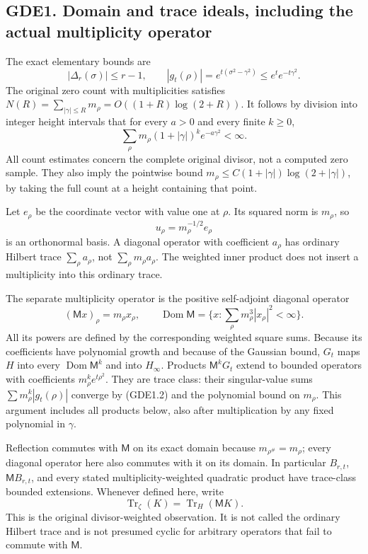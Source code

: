 \subsection{GDE1. Domain and trace ideals, including the actual
multiplicity
operator}\label{gde1.-domain-and-trace-ideals-including-the-actual-multiplicity-operator}

The exact elementary bounds are \[
|\Delta_r(\sigma)|\le r-1,\qquad
|g_t(\rho)|=e^{t(\sigma^2-\gamma^2)}\le e^t e^{-t\gamma^2}.
\tag{GDE1.1}
\] The original zero count with multiplicities satisfies
\(N(R)=\sum_{|\gamma|\le R}m_\rho=O((1+R)\log(2+R))\). It follows by
division into integer height intervals that for every \(a>0\) and every
finite \(k\ge0\), \[
\sum_\rho m_\rho(1+|\gamma|)^k e^{-a\gamma^2}<\infty.
\tag{GDE1.2}
\] All count estimates concern the complete original divisor, not a
computed zero sample. They also imply the pointwise bound
\(m_\rho\le C(1+|\gamma|)\log(2+|\gamma|)\), by taking the full count at
a height containing that point.

Let \(e_\rho\) be the coordinate vector with value one at \(\rho\). Its
squared norm is \(m_\rho\), so \[
u_\rho=m_\rho^{-1/2}e_\rho
\tag{GDE1.3}
\] is an orthonormal basis. A diagonal operator with coefficient
\(a_\rho\) has ordinary Hilbert trace \(\sum_\rho a_\rho\), not
\(\sum_\rho m_\rho a_\rho\). The weighted inner product does not insert
a multiplicity into this ordinary trace.

The separate multiplicity operator is the positive self-adjoint diagonal
operator \[
(\mathsf Mx)_\rho=m_\rho x_\rho,
\qquad \operatorname{Dom}\mathsf M
=\{x:\sum_\rho m_\rho^3|x_\rho|^2<\infty\}.
\tag{GDE1.4}
\] All its powers are defined by the corresponding weighted square sums.
Because its coefficients have polynomial growth and because of the
Gaussian bound, \(G_t\) maps \(H\) into every
\(\operatorname{Dom}\mathsf M^k\) and into \(H_\infty\). Products
\(\mathsf M^kG_t\) extend to bounded operators with coefficients
\(m_\rho^ke^{t\rho^2}\). They are trace class: their singular-value sums
\(\sum m_\rho^k|g_t(\rho)|\) converge by (GDE1.2) and the polynomial
bound on \(m_\rho\). This argument includes all products below, also
after multiplication by any fixed polynomial in \(\gamma\).

Reflection commutes with \(\mathsf M\) on its exact domain because
\(m_{\rho^\#}=m_\rho\); every diagonal operator here also commutes with
it on its domain. In particular \(B_{r,t}\), \(\mathsf M B_{r,t}\), and
every stated multiplicity-weighted quadratic product have trace-class
bounded extensions. Whenever defined here, write \[
\operatorname{Tr}_{\zeta}(K)=\operatorname{Tr}_H(\mathsf M K).
\tag{GDE1.5}
\] This is the original divisor-weighted observation. It is not called
the ordinary Hilbert trace and is not presumed cyclic for arbitrary
operators that fail to commute with \(\mathsf M\).

